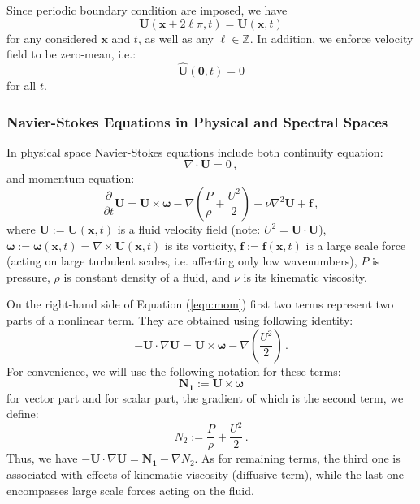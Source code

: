 \documentclass{pracamgren}
\begin{document}
Since periodic boundary condition are imposed, we have
$$ \mathbf{U}(\mathbf{x} + 2 \ell \pi, t) = \mathbf{U}(\mathbf{x}, t)$$
for any considered $\mathbf{x}$ and $t$, as well as any $\ell \in \mathbb{Z}$.
In addition, we enforce velocity field to be zero-mean, i.e.:
$$ \mathbf{\hat{U}}(\mathbf{0}, t) = 0$$
for all $t$.

\subsubsection{Navier-Stokes Equations in Physical and Spectral Spaces}

In physical space Navier-Stokes equations include both continuity equation:
\begin{equation}
\label{eqn:cont}
\nabla \cdot \mathbf{U} = 0 \, ,
\end{equation}
and momentum equation:
\begin{equation}
\label{eqn:mom}
\frac{\partial}{\partial t} \mathbf{U} = \mathbf{U} \times \boldsymbol{\omega} - \nabla \left( \frac{P}{\rho} + \frac{U^2}{2} \right) + \nu \nabla^2 \mathbf{U} + \mathbf{f} \, ,
\end{equation}
where $\mathbf{U} := \mathbf{U}(\mathbf{x}, t)$ is a fluid velocity field (note: $U^2 = \mathbf{U} \cdot \mathbf{U}$), $ \boldsymbol{\omega} := \boldsymbol{\omega}(\mathbf{x}, t) = \nabla \times \mathbf{U}(\mathbf{x}, t) $ is its vorticity, $\mathbf{f} := \mathbf{f}(\mathbf{x}, t)$ is a large scale force (acting on large turbulent scales, i.e. affecting only low wavenumbers), $P$ is pressure, $\rho$ is constant density of a fluid, and $\nu$ is its kinematic viscosity.

On the right-hand side of Equation (\ref{eqn:mom}) first two terms represent two parts of a nonlinear term. They are obtained using following identity:
$$ - \mathbf{U} \cdot \nabla \mathbf{U} = \mathbf{U} \times \boldsymbol{\omega} - \nabla \left( \frac{U^2}{2} \right) \, . $$
For convenience, we will use the following notation for these terms:
$$ \mathbf{N_1} := \mathbf{U} \times \boldsymbol{\omega} $$
for vector part and for scalar part, the gradient of which is the second term, we define:
$$ N_2 := \frac{P}{\rho} + \frac{U^2}{2} \, . $$
Thus, we have $ - \mathbf{U} \cdot \nabla \mathbf{U} = \mathbf{N_1} - \nabla N_2$.
As for remaining terms, the third one is associated with effects of kinematic viscosity (diffusive term), while the last one encompasses large scale forces acting on the fluid.
\end{document}
